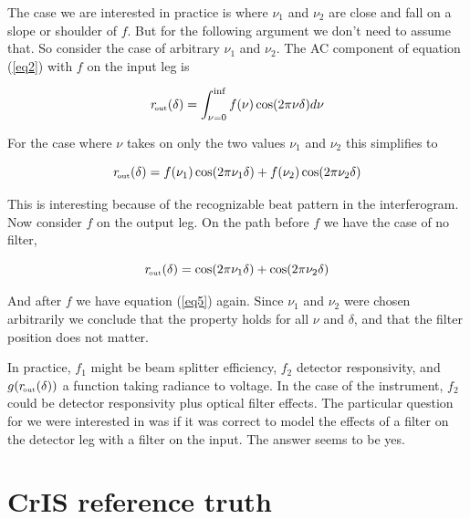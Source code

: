 \documentclass[12pt]{article}
\begin{document}
The case we are interested in practice is where $\nu_1$ and $\nu_2$
are close and fall on a slope or shoulder of $f$.  But for the
following argument we don't need to assume that.  So consider the
case of arbitrary $\nu_1$ and $\nu_2$.  The AC component of equation
(\ref{eq2}) with $f$ on the input leg is

\begin{equation}\label{eq4}
  r_{\!\mbox{\tiny out}}(\delta) = \int_{\nu=0}^{\inf}f(\nu)\cos(2\pi\nu\delta)d\nu
\end{equation}

\noindent
For the case where $\nu$ takes on only the two values $\nu_1$ and
$\nu_2$ this simplifies to

\begin{equation}\label{eq5}
  r_{\!\mbox{\tiny out}}(\delta) = f(\nu_1)\cos(2\pi\nu_1\delta) + 
                  f(\nu_2)\cos(2\pi\nu_2\delta)
\end{equation}

\noindent
This is interesting because of the recognizable beat pattern in 
the interferogram.  Now consider $f$ on the output leg.  On the 
path before $f$ we have the case of no filter,

\begin{equation}\label{eq6}
  r_{\!\mbox{\tiny out}}(\delta) = \cos(2\pi\nu_1\delta) + 
                  \cos(2\pi\nu_2\delta)
\end{equation}

\noindent
And after $f$ we have equation (\ref{eq5}) again.  Since $\nu_1$ and
$\nu_2$ were chosen arbitrarily we conclude that the property holds
for all $\nu$ and $\delta$, and that the filter position does not
matter.

In practice, $f_1$ might be beam splitter efficiency, $f_2$ detector
responsivity, and $g(r_{\!\mbox{\tiny out}}(\delta))$ a function taking radiance to
voltage.  In the case of the {\cris} instrument, $f_2$ could be
detector responsivity plus optical filter effects.  The particular
question for {\cris} we were interested in was if it was correct
to model the effects of a filter on the detector leg with a filter
on the input.  The answer seems to be yes.

\FloatBarrier

\section{CrIS reference truth }
\end{document}
